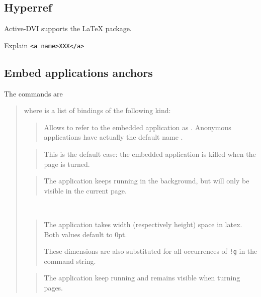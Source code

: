 \documentclass[12pt]{article}
\def \ActiveDVI {Active-DVI}
\begin{document}
\subsection {Hyperref}

{\ActiveDVI} supports the  {\LaTeX} package. 

Explain \verb"<a name>XXX</a>"

\subsection {Embed applications anchors}

The commands are 

\medskip\noindent
\docdef \adviembed{} 

\begin{quote}
where  is a list of bindings of the following kind:

\begin{quote}
Allows to refer to the embedded application as . 
Anonymous applications have actually the default name .
\end{quote}


\begin{quote}
This is the default case: the embedded application is killed when the page
is turned.
\end{quote}


\begin{quote}
The application keeps running in the background, but will only be visible in
the current page.
\end{quote}

\\
\begin{quote}
The application takes  width (respectively height) space in 
latex. Both values default to 0pt.

These dimensions are also substituted for all occurrences of \verb"!g" in
the command string.
\end{quote}

\begin{quote}
The application keep running and remains visible when turning pages.
\end{quote}

\end{quote}
\end{document}
